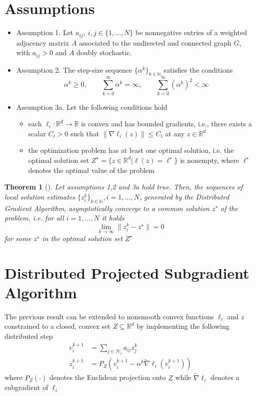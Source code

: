 \documentclass{book}
\newcommand{\R}{\mathbb{R}}
\newcommand{\N}{\mathbb{N}}
\theoremstyle{theoremv2}
\newtheorem{theorem}{Theorem}[chapter]
\theoremstyle{defv2}
\theoremstyle{remark}
\theoremstyle{remark}
\theoremstyle{definition}
\theoremstyle{definition}
\begin{document}
\section{Assumptions}
\begin{itemize}
    \item Assumption 1. Let $a_{ij},\ i,j \in \{1,\dots,N\}$ be nonnegative entries of a weighted adjacency matrix $A$ associated to the undirected and connected graph $G$, with $a_{ij}>0$ and $A$ doubly stochastic.
    \item Assumption 2. The step-size sequence $\{\alpha^k\}_{k\in\N}$ satisfies the conditions
        \[
            \alpha^k \geq 0, \qquad \displaystyle\sum_{k=0}^{\infty}\alpha^k = \infty, \qquad \displaystyle\sum_{k=0}^{\infty} (\alpha^k)^2 < \infty
        \]
    \item Assumption 3a. Let the following conditions hold 
        \begin{itemize}
            \item each $\ell_i:\R^d\to\R$ is convex and has bounded gradients, i.e., there exists a scalar $C_i>0$ such that $\|\nabla \ell_i(z)\|\leq C_i$ at any $z\in\R^d$
            \item the optimization problem has at least one optimal solution, i.e. the optimal solution set $Z^\star = \{z\in\R^d|\ell(z)=\ell^\star\}$ is nonempty, where $\ell^\star$ denotes the optimal value of the problem
        \end{itemize}
\end{itemize}
\begin{theorem}[]
    Let assumptions 1,2 and 3a hold true. Then, the sequences of local solution estimates $\{z_i^k\}_{k\in\N}, i=1,\dots,N$, generated by the Distributed Gradient Algorithm, asymptotically converge to a common solution $z^\star$ of the problem, i.e. for all $i=1,\dots,N$ it holds 
    \[
        \lim_{k\to\infty} \|z_i^k-z^\star\| = 0
    \]
    for some $z^\star$ in the optimal solution set $Z^\star$
\end{theorem}

\section{Distributed Projected Subgradient Algorithm}
The previous result can be extended to nonsmooth convex functions $\ell_i$ and $z$ constrained to a closed, convex set $Z\subseteq \R^d$ by implementing the following distributed step
\begin{align*}
    v_i^{k+1} &= \displaystyle\sum_{j\in\mathcal{N_i}}a_{ij} z_j^k \\
    z_i^{k+1} &= P_Z\left(v_i^{k+1} - \alpha^k \tilde{\nabla}\ell_i(v_i^{k+1})\right)
\end{align*}
where $P_Z(\cdot)$ denotes the Euclidean projection onto $Z$ while $\tilde\nabla\ell_i$ denotes a subgradient of $\ell_i$
\end{document}
